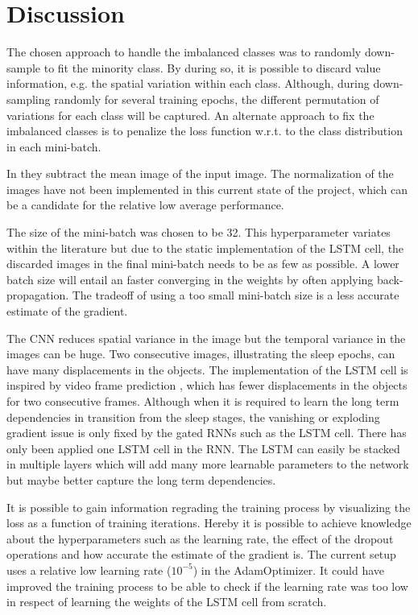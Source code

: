 \section{Discussion}
\label{sec:discussion}

The chosen approach to handle the imbalanced classes was to randomly down-sample to fit the minority class. By during so, it is possible to discard value information, e.g. the spatial variation within each class. Although, during down-sampling randomly for several training epochs, the different permutation of variations for each class will be captured.  
An alternate approach to fix the imbalanced classes is to penalize the loss function w.r.t. to the class distribution in each mini-batch.

In \cite{	main_ar,VGGnet16} they subtract the mean image of the input image. The normalization of the images have not been implemented in this current state of the project, which can be a candidate for the relative low average performance.

The size of the mini-batch was chosen to be 32. This hyperparameter variates within the literature but due to the static implementation of the LSTM cell, the discarded images in the final mini-batch needs to be as few as possible. A lower batch size will entail an faster converging in the weights by often applying back-propagation. The tradeoff of using a too small mini-batch size is a less accurate estimate of the gradient. 

The CNN reduces spatial variance in the image but the temporal variance in the images can be huge. Two consecutive images, illustrating the sleep epochs, can have many displacements in the objects. The implementation of the LSTM cell is inspired by video frame prediction \cite{git_lstm}, which has fewer displacements in the objects for two consecutive frames. Although when it is required to learn the long term dependencies in transition from the sleep stages, the vanishing or exploding gradient issue is only fixed by the gated RNNs such as the LSTM cell.
There has only been applied one LSTM cell in the RNN. The LSTM can easily be stacked in multiple layers which will add many more learnable parameters to the network but maybe better capture the long term dependencies.

It is possible to gain information regrading the training process by visualizing the loss as a function of training iterations. Hereby it is possible to achieve knowledge about the hyperparameters such as the learning rate, the effect of the dropout operations and how accurate the estimate of the gradient is. The current setup uses a relative low learning rate ($10^{-5}$) in the AdamOptimizer. It could have improved the training process to be able to check if the learning rate was too low in respect of learning the weights of the LSTM cell from scratch.

